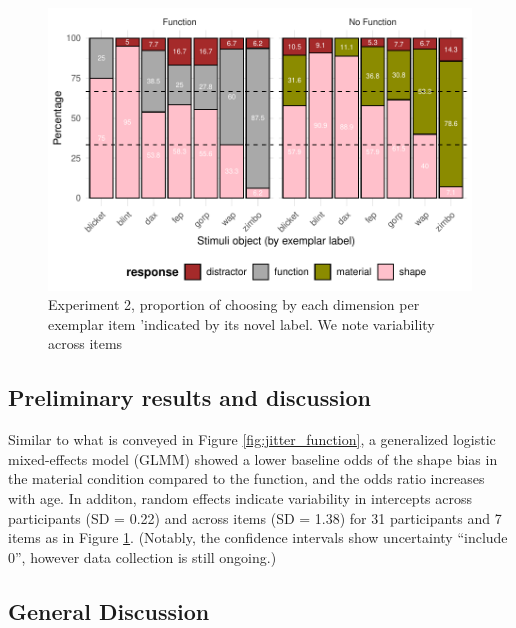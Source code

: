 \documentclass[10pt, letterpaper]{article}
\begin{document}
\begin{CodeChunk}
\begin{figure}[tb]
\includegraphics[width=1\linewidth]{figs/sec_exp_stim-1} \caption[Experiment 2, proportion of choosing by each dimension per exemplar item 'indicated by its novel label]{Experiment 2, proportion of choosing by each dimension per exemplar item 'indicated by its novel label. We note variability across items}\label{fig:sec_exp_stim}
\end{figure}
\end{CodeChunk}

\subsection{Preliminary results and
discussion}\label{preliminary-results-and-discussion}

Similar to what is conveyed in Figure \ref{fig:jitter_function}, a
generalized logistic mixed-effects model (GLMM) showed a lower baseline
odds of the shape bias in the material condition compared to the
function, and the odds ratio increases with age. In additon, random
effects indicate variability in intercepts across participants (SD =
0.22) and across items (SD = 1.38) for 31 participants and 7 items as in
Figure \ref{fig:sec_exp_stim}. (Notably, the confidence intervals show
uncertainty ``include 0'', however data collection is still ongoing.)

\subsection{General Discussion}\label{general-discussion}
\end{document}
